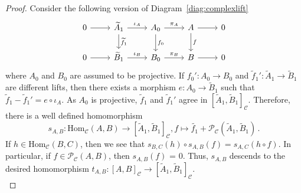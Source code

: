 \documentclass[12pt,a4paper]{article}
\numberwithin{equation}{section}
\theoremstyle{nonumberplain}
\newtheorem{proof}{Proof}
\begin{document}
\begin{proof}
Consider the following version of Diagram~\ref{diag:complexlift}
\begin{equation}\label{diag:simplelift}
\begin{tikzcd}
    0 \arrow[r] & \widetilde{A}_1 \arrow[r, "\iota_A"] \arrow[d, "\widetilde{f}_1"] & A_0 \arrow[r, "\pi_A"] \arrow[d, "f_0"] & A \arrow[r] \arrow[d, "f"] & 0 \\
    0 \arrow[r] & \widetilde{B}_1 \arrow[r, "\iota_B"] & B_0 \arrow[r, "\pi_B"] & B \arrow[r] & 0
\end{tikzcd}
\end{equation}
where $A_0$ and $B_0$ are assumed to be projective. If $f_0': A_0 \rightarrow B_0$ and $\widetilde{f}_1': \widetilde{A}_1 \rightarrow \widetilde{B}_1$ are different lifts, then there exists a morphism $e: A_0 \rightarrow \widetilde{B}_1$ such that $\widetilde{f}_1-\widetilde{f}_1' = e \circ \iota_A$. As $A_0$ is projective, $\widetilde{f}_1$ and $\widetilde{f}_1'$ agree in $[\widetilde{A}_1, \widetilde{B}_1]_{\mathcal{C}}$. Therefore, there is a well defined homomorphism
\[ s_{A, B}: \mathrm{Hom}_{\mathcal{C}}(A, B) \rightarrow [\widetilde{A}_1, \widetilde{B}_1]_{\mathcal{C}}, f \mapsto \widetilde{f_1}+\mathcal{P}_{\mathcal{C}}(\widetilde{A}_1, \widetilde{B}_1) \, . \]
If $h \in \mathrm{Hom}_{\mathcal{C}}(B, C)$, then we see that $s_{B, C}(h) \circ s_{A, B}(f) = s_{A, C}(h \circ f)$. In particular, if $f \in \mathcal{P}_{\mathcal{C}}(A, B)$, then $s_{A, B}(f)$ = 0. Thus, $s_{A, B}$ descends to the desired homomorphism $t_{A, B}: [A, B]_{\mathcal{C}} \rightarrow [\widetilde{A}_1, \widetilde{B}_1]_{\mathcal{C}}$. \\


\end{proof}
\end{document}
